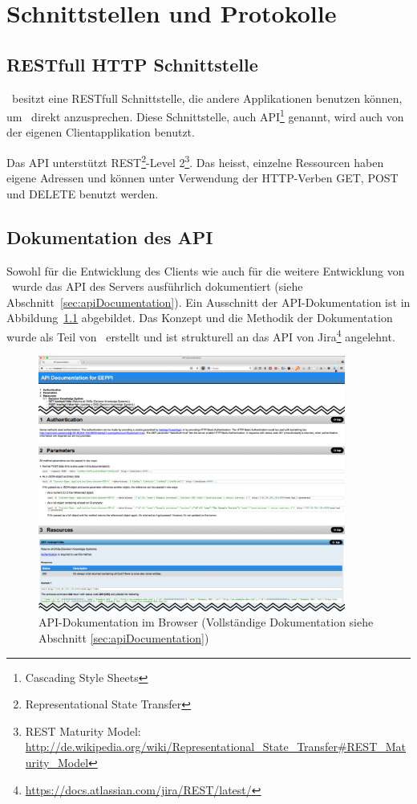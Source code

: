 \chapter{Schnittstellen und Protokolle}
	
\section{RESTfull HTTP Schnittstelle}

	\eeppi\ besitzt eine RESTfull Schnittstelle, die andere Applikationen benutzen können, um \eeppi\ direkt anzusprechen.
	Diese Schnittstelle, auch API\footnote{Cascading Style Sheets} genannt, wird auch von der eigenen Clientapplikation benutzt.

	Das API unterstützt REST\footnote{Representational State Transfer}-Level 2\footnote{REST Maturity Model: \url{http://de.wikipedia.org/wiki/Representational\_State\_Transfer\#REST\_Maturity\_Model}}.
	Das heisst, einzelne Ressourcen haben eigene Adressen
	und können unter Verwendung der HTTP-Verben GET, POST und DELETE benutzt werden.
	
\section{Dokumentation des API}
	\label{sec:apiDokumentationCreation}
	Sowohl für die Entwicklung des Clients wie auch für die weitere Entwicklung von \eeppi\ wurde das API des Servers ausführlich dokumentiert (siehe Abschnitt~\ref{sec:apiDocumentation}).
	Ein Ausschnitt der API-Dokumentation ist in Abbildung~\ref{fig:apiScreenshot} abgebildet.
	Das Konzept und die Methodik der Dokumentation wurde als Teil von \eeppi\ erstellt
	und ist strukturell an das API von Jira\footnote{\url{https://docs.atlassian.com/jira/REST/latest/}} angelehnt.
	
	\begin{figure}[H]
		\includegraphics[width=0.9\textwidth]{interfacesAndProtocols/media/img/apiDocumentation.png}
		\centering
		\caption{API-Dokumentation im Browser (Vollständige Dokumentation siehe Abschnitt \ref{sec:apiDocumentation}) }
		\label{fig:apiScreenshot}
	\end{figure}


